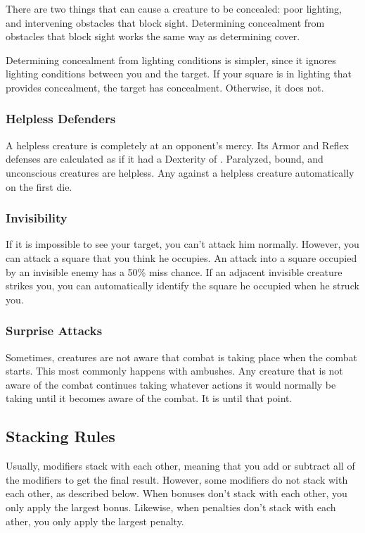              There are two things that can cause a creature to be concealed: poor lighting, and intervening obstacles that block sight.
            Determining concealment from obstacles that block sight works the same way as determining cover.

            Determining concealment from lighting conditions is simpler, since it ignores lighting conditions between you and the target.
            If your  square is in lighting that provides concealment, the target has concealment.
            Otherwise, it does not.

        \subsubsection{Helpless Defenders}
            A helpless creature is completely at an opponent's mercy.
            Its Armor and Reflex defenses are calculated as if it had a Dexterity of .
            Paralyzed, bound, and unconscious creatures are helpless.
            Any  against a helpless creature automatically  on the first die.

        \subsubsection{Invisibility}\label{Invisibility}
            If it is impossible to see your target, you can't attack him normally. However, you can attack a square that you think he occupies. An attack into a square occupied by an invisible enemy has a 50\% miss chance. If an adjacent invisible creature strikes you, you can automatically identify the square he occupied when he struck you.

        \subsubsection{Surprise Attacks}\label{Surprise Attacks}
            Sometimes, creatures are not aware that combat is taking place when the combat starts. This most commonly happens with ambushes. Any creature that is not aware of the combat continues taking whatever actions it would normally be taking until it becomes aware of the combat. It is \unaware until that point.

    \subsection{Stacking Rules}\label{Stacking Rules}
        Usually, modifiers stack with each other, meaning that you add or subtract all of the modifiers to get the final result.
        However, some modifiers do not stack with each other, as described below.
        When bonuses don't stack with each other, you only apply the largest bonus.
        Likewise, when penalties don't stack with each ather, you only apply the largest penalty.

